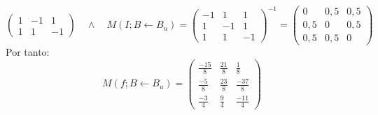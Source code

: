 \begin{ejercicio}
\begin{equation*}
\begin{pmatrix}
			1  & -1 & 1  \\
			1  & 1  & -1
		\end{pmatrix} \quad \land \quad M(I;B \leftarrow B_u) = \begin{pmatrix}
			-1 & 1  & 1  \\
			1  & -1 & 1  \\
			1  & 1  & -1
		\end{pmatrix}^{-1} = \begin{pmatrix}
			0   & 0,5 & 0,5 \\
			0,5 & 0   & 0,5 \\
			0,5 & 0,5 & 0
		\end{pmatrix}
	\end{equation*}
	Por tanto:
	\begin{equation*}
		M(f;B \leftarrow B_u) = \begin{pmatrix}
			\frac{-15}{8} & \frac{21}{8} & \frac{1}{8}   \\
			\frac{-5}{8}  & \frac{23}{8} & \frac{-37}{8} \\
			\frac{-3}{4}  & \frac{9}{4}  & \frac{-11}{4}
		\end{pmatrix}
	\end{equation*}
\end{ejercicio}


